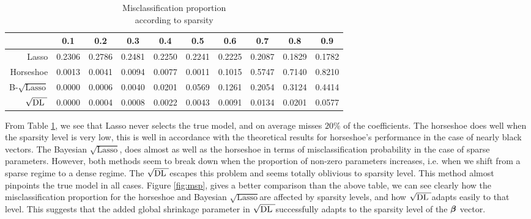 \documentclass[10pt]{article}
\def\sql{$\sqrt{\text{Lasso}}$}
\def\sqdl{$\sqrt{\text{\rm{DL} }}$}
\begin{document}
\begin{table}[h!]
\caption{Misclassification proportion \\ according to sparsity}\label{table:msp}
\begin{center}
\footnotesize{
\begin{tabular}{c|c|c|c|c|c|c|c|c|c|}
\cline{2-10}
    & 0.1  &  0.2  &  0.3  &  0.4  &  0.5 &   0.6  &  0.7  &  0.8 &   0.9 	\\
\hline
\multicolumn{1}{|r|}{Lasso} &  0.2306 & 0.2786 & 0.2481 & 0.2250 & 0.2241 & 0.2225 & 0.2087 & 0.1829 & 0.1782	\\
\hline
\multicolumn{1}{|r|}{Horseshoe} &  0.0013 & 0.0041 & 0.0094 & 0.0077 & 0.0011 & 0.1015 & 0.5747 & 0.7140 & 0.8210\\
\hline
\multicolumn{1}{|r|}{B-\sql} & 0.0000 & 0.0006 & 0.0040 & 0.0201 & 0.0569 & 0.1261 & 0.2054 & 0.3124 & 0.4414 \\
\hline
\multicolumn{1}{|r|}{\sqdl} & 0.0000 & 0.0004 & 0.0008 & 0.0022 & 0.0043 & 0.0091 & 0.0134 & 0.0201 & 0.0577 \\
\hline
\end{tabular}}
\end{center}

\end{table}

From Table \ref{table:msp}, we see that Lasso never selects the true model, and on average misses $20 \% $ of the coefficients. The horseshoe does well when the sparsity  level is very low, this is well in accordance with the theoretical results for horseshoe's performance in the case of nearly black vectors. The Bayesian \sql, does almost as well as the horseshoe in terms of misclassification probability in the case of sparse parameters. However, both methods seem to break down when the proportion of non-zero parameters increases, i.e. when we shift from a sparse regime to a dense regime. The \sqdl escapes this problem and seems totally oblivious to sparsity level. This method almost pinpoints the true model in all cases. Figure \ref{fig:msp}, gives a better comparison than the above table, we can see clearly how the misclassification proportion for the horseshoe and Bayesian \sql are affected by sparsity levels, and how \sqdl adapts easily to that level. This suggests that the added global shrinkage parameter in \sqdl  successfully adapts to the sparsity level of the $\boldsymbol{\beta}$ vector. 
\end{document}
